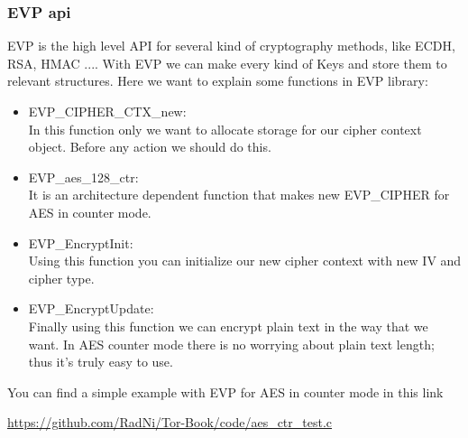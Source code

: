 \subsubsection{EVP api}
EVP is the high level API for several kind of cryptography methods, like ECDH, RSA, HMAC .... With EVP we can make every kind of Keys and store them to relevant structures.
Here we want to explain some functions in EVP library:
\begin{itemize}
	\item EVP\_CIPHER\_CTX\_new: \\
	In this function only we want to allocate storage for our cipher context object. Before any action we should do this.
	\item EVP\_aes\_128\_ctr: \\
	It is an architecture dependent function that makes new EVP\_CIPHER for AES in counter mode.
	\item EVP\_EncryptInit: \\
	Using this function you can initialize our new cipher context with new IV and cipher type.
	\item EVP\_EncryptUpdate: \\
	Finally using this function we can encrypt plain text in the way that we want. In AES counter mode there is no worrying about plain text length; thus it's truly easy to use.
\end{itemize}
You can find a simple example with EVP for AES in counter mode in this link

\url{https://github.com/RadNi/Tor-Book/code/aes\_ctr\_test.c}



